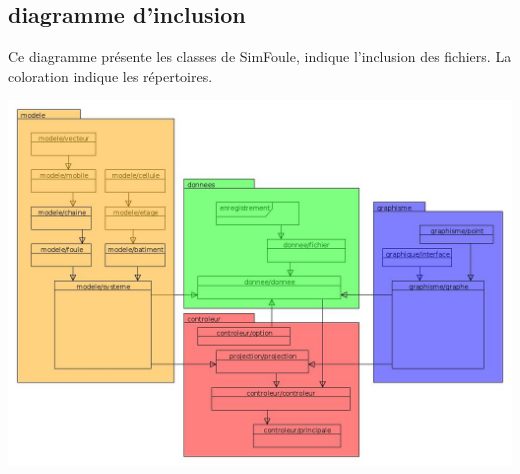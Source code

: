 \subsection{diagramme d'inclusion}
%
Ce diagramme présente les classes de SimFoule, indique l'inclusion des fichiers. La coloration indique les répertoires.
%
\begin{center}
\includegraphics[scale=0.45]{./illustration/classesSimFoule}
\end{center}
%

%
\newpage
%
